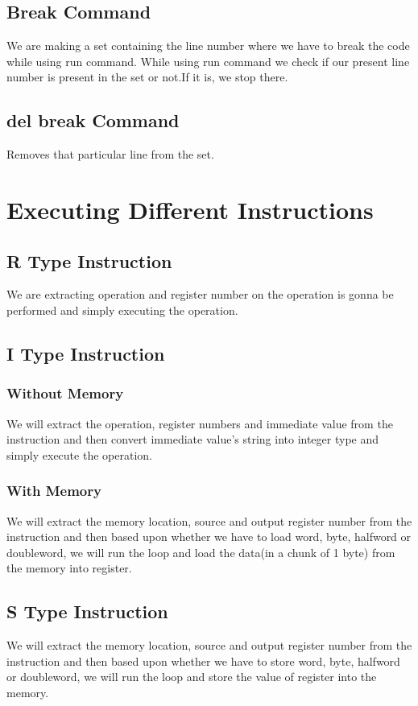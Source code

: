 \documentclass{article}
\begin{document}
	\subsection{Break Command}
	We are making a set containing the line number where we have to break the code while using run command. While using run command we check if our present line number is present in the set or not.If it is, we stop there.
	\subsection{del break Command}
	Removes that particular line from the set.

	\section{Executing Different Instructions}
	\subsection{R Type Instruction}
	We are extracting operation and register number on the operation is gonna be performed and simply executing the operation.
	\subsection{I Type Instruction}
	\subsubsection{Without Memory}
	We will extract the operation, register numbers and immediate value from the instruction and then convert immediate value's string into integer type and simply execute the operation.
	\subsubsection{With Memory}
	We will extract the memory location, source and output register number from the instruction and then based upon whether we have to load word, byte, halfword or doubleword, we will run the loop and load the data(in a chunk of 1 byte) from the memory into register.
	\subsection{S Type Instruction}
	We will extract the memory location, source and output register number from the instruction and then based upon whether we have to store word, byte, halfword or doubleword, we will run the loop and store the value of register into  the memory.
\end{document}
